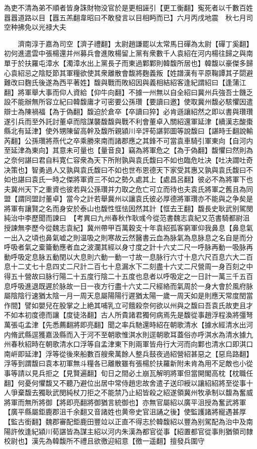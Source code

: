為吏不清為弟不順者皆身誅財物没官於是更相誣引【更工衡翻】寃死者以千數百姓囂囂道路以目【囂五羔翻韋昭曰不敢發言以目相眄而已】六月丙戌地震　秋七月司空种拂免以光禄大夫

　　濟南淳于嘉為司空【濟子禮翻】太尉趙謙罷以太常馬日磾為太尉【磾丁奚翻】　初何進遣雲中張楊還并州募兵會進敗楊留上黨有衆數千人袁紹在河内楊往歸之與南單于於扶羅屯漳水【濁漳水出上黨長子而東過鄴鄴則韓馥所居也】韓馥以豪傑多歸心袁紹忌之陰貶節其軍糧欲使其衆離散會馥將麴義叛【姓譜漢有平原鞠譚其子閟避難改曰麴氏後遂為西平著姓】馥與戰而敗紹因與義相結紹客逢紀謂紹曰【逢蒲江翻】將軍舉大事而仰人資給【仰牛向翻】不據一州無以自全紹曰冀州兵強吾士饑乏設不能辦無所容立紀曰韓馥庸才可密要公孫瓚【要讀曰邀】使取冀州馥必駭懼因遣辯士為陳禍福【為于偽翻】馥迫於倉卒【卒讀曰猝】必肯遜讓紹然之即以書與瓚瓚遂引兵而至外託討董卓而陰謀襲馥馥與戰不利會董卓入關紹還軍延津【續漢志酸棗縣北有延津】使外甥陳留高幹及馥所親潁川辛評荀諶郭圖等說馥曰【諶時壬翻說輸芮翻】公孫瓚將燕代之卒乘勝來南而諸郡應之其鋒不可當袁車騎引軍東向【自河内至延津為東向】其意未可量也【量音良】竊為將軍危之【為于偽翻】馥懼曰然則為之奈何諶曰君自料寛仁容衆為天下所附孰與袁氏馥曰不如也臨危吐决【吐决謂吐奇决策也】智勇過人又孰與袁氏馥曰不如也世布恩德天下家受其惠又孰與袁氏馥曰不如也諶曰袁氏一時之傑將軍資三不如之勢久處其上【處昌呂翻】彼必不為將軍下也夫冀州天下之重資也彼若與公孫瓚并力取之危亡可立而待也夫袁氏將軍之舊且為同盟【謂同盟討董卓】當今之計若舉冀州以讓袁氏彼必厚德將軍瓚亦不能與之争矣是將軍有讓賢之名而身安於泰山也馥性恇怯因然其計【恇去王翻】馥長史耿武别駕閔純治中李歷聞而諫曰　【考異曰九州春秋作耿彧今從范書魏志袁紀又范書騎都尉沮授諫無李歷今從魏志袁紀】冀州帶甲百萬穀支十年袁紹孤客窮軍仰我鼻息【鼻息氣一出入之頃也鼻氣嘘之則温吸之則寒故云然醫書云血為脉氣為息脉息之名自是而分呼吸者氣之槖籥動應者血之波瀾其經以身寸度之計十六丈二尺一呼脉再動一吸脉再動呼吸定息脉五動閏以大息則六動一動一寸故一息脉行六寸十息六尺百息六大二百息十二丈七十息四丈二尺計二百七十息漏水下二刻盡十六丈二尺營周一身百刻之中得五十營故曰脉行陽二十五度行陰二十五度也息者以呼吸定之一日計一萬三千五百息呼吸進退既遲於脉故一日一夜方行盡十六丈二尺經絡而氣周於一身大會於風府脉屬陰陰行速猶太陰一月一周天息屬陽陽行遲猶太陽一歲一周天如是則應天常度閏當作間】譬如嬰兒在股掌之上絶其哺乳立可餓殺奈何欲以州與之馥曰吾袁氏故吏且才不如本初度德而讓【度徒洛翻】古人所貴諸君獨何病焉先是馥從事趙浮程渙將彊弩萬張屯孟津【先悉薦翻將即亮翻】聞之率兵馳還時紹在朝歌清水【據水經清水出河内脩武縣逕獲嘉汲縣而入于河不至朝歌惟淇水則逕朝歌耳蓋俗亦呼淇水為清水據九州春秋紹時在朝歌清水口浮等自孟津東下則兩軍皆舟行大河而向鄴也清水口即淇口南㟁即延津】浮等從後來船數百艘衆萬餘人整兵鼓夜過紹營紹甚惡之【惡烏路翻】浮等到謂馥曰袁本初軍無斗糧各已離散雖有張楊於扶羅新附未肯為用不足敵也小從事等請以見兵拒之【見賢遍翻】旬日之間必土崩瓦解明將軍但當開閣高枕【枕職任翻】何憂何懼馥又不聽乃避位出居中常侍趙忠故舍遣子送印綬以讓紹紹將至從事十人爭棄馥去獨耿武閔純杖刀拒之不能禁乃止紹皆殺之紹遂領冀州牧承制以馥為奮威將軍而無所將御【將即亮翻將御猶言統御也】亦無官屬紹以廣平沮授為奮武將軍【廣平縣屬鉅鹿郡沮千余翻又音諸姓也黄帝史官沮誦之後】使監護諸將寵遇甚厚【監古銜翻】魏郡審配鉅鹿田豐竝以正直不得志於韓馥紹以豐為别駕配為治中及南陽許攸逢紀潁川荀諶皆為謀主紹以河内朱漢為都官從事【紹置都官從事則猶領司隸校尉也】漢先為韓馥所不禮且欲徼迎紹意【徼一遥翻】擅發兵圍守